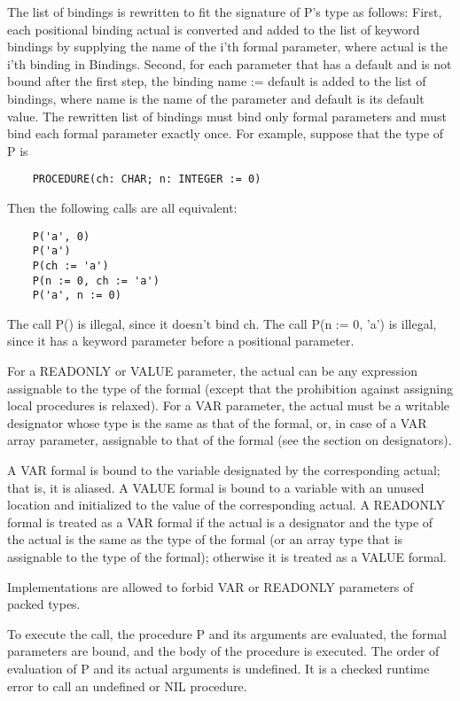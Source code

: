 \documentclass[10pt]{article}
\begin{document}
 The list of bindings is rewritten to fit the signature of P's type as follows: First, each positional binding actual is converted and added to the list of keyword bindings by supplying the name of the i'th formal parameter, where actual is the i'th binding in Bindings. Second, for each parameter that has a default and is not bound after the first step, the binding name := default is added to the list of bindings, where name is the name of the parameter and default is its default value. The rewritten list of bindings must bind only formal parameters and must bind each formal parameter exactly once. For example, suppose that the type of P is 
\begin{verbatim}
    PROCEDURE(ch: CHAR; n: INTEGER := 0)
\end{verbatim}
 Then the following calls are all equivalent: 
\begin{verbatim}
    P('a', 0)
    P('a')
    P(ch := 'a')
    P(n := 0, ch := 'a')
    P('a', n := 0)
\end{verbatim}
 The call P() is illegal, since it doesn't bind ch. The call P(n := 0, 'a') is illegal, since it has a keyword parameter before a positional parameter. 


 For a READONLY or VALUE parameter, the actual can be any expression assignable to the type of the formal (except that the prohibition against assigning local procedures is relaxed). For a VAR parameter, the actual must be a writable designator whose type is the same as that of the formal, or, in case of a VAR array parameter, assignable to that of the formal (see the section on designators). 


 A VAR formal is bound to the variable designated by the corresponding actual; that is, it is aliased. A VALUE formal is bound to a variable with an unused location and initialized to the value of the corresponding actual. A READONLY formal is treated as a VAR formal if the actual is a designator and the type of the actual is the same as the type of the formal (or an array type that is assignable to the type of the formal); otherwise it is treated as a VALUE formal. 


 Implementations are allowed to forbid VAR or READONLY parameters of packed types. 


 To execute the call, the procedure P and its arguments are evaluated, the formal parameters are bound, and the body of the procedure is executed. The order of evaluation of P and its actual arguments is undefined. It is a checked runtime error to call an undefined or NIL procedure. 
\end{document}
